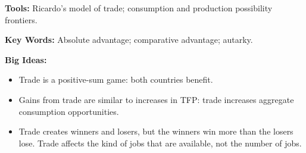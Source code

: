 \textbf{Tools:} Ricardo's model of trade; consumption and production possibility frontiers.

\textbf{Key Words:} Absolute advantage; comparative advantage; autarky.

\textbf{Big Ideas:}
\begin{itemize}
    \item Trade is a positive-sum game:  both countries benefit.
    \item Gains from trade are similar to increases in TFP:  trade increases aggregate consumption opportunities.
    \item Trade creates winners and losers, but the winners win more than the losers lose.
 Trade affects the kind of jobs that are available, not the number of jobs.
\end{itemize}
